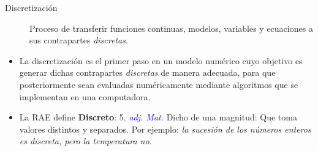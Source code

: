 \documentclass{beamer}
\begin{document}
\begin{frame}

\begin{description}
	\item[Discretización]  Proceso de transferir funciones continuas, modelos, variables y ecuaciones a sus contrapartes \textit{discretas}. 
\end{description}
\begin{itemize}
	\item {\small  La discretización es el primer paso en un modelo numérico cuyo objetivo es generar dichas contrapartes \textit{discretas} de manera adecuada, para que posteriormente sean evaluadas numéricamente mediante algoritmos que se implementan en una computadora.}
	
	\strut
	
	\item {\small La RAE define \textbf{Discreto}: 5. \textcolor{blue}{\textit{adj. Mat.}} Dicho de una magnitud: Que toma valores distintos y separados. 
		Por ejemplo: \textit{la sucesión de los números enteros es discreta, pero la temperatura no}.}
\end{itemize}
%
\end{frame}
\end{document}
